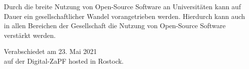 \documentclass[DIV=calc]{scrartcl}
\begin{document}
Durch die breite Nutzung von Open-Source Software an Universitäten kann auf Dauer ein gesellschaftlicher Wandel vorangetrieben werden. Hierdurch kann auch in allen Bereichen der Gesellschaft die Nutzung von Open-Source Software verstärkt werden. 

\vspace{1cm} 

\vfill
\begin{flushright}
	Verabschiedet am 23. Mai 2021 \\
	auf der Digital-ZaPF hosted in Rostock.
\end{flushright}
\end{document}
